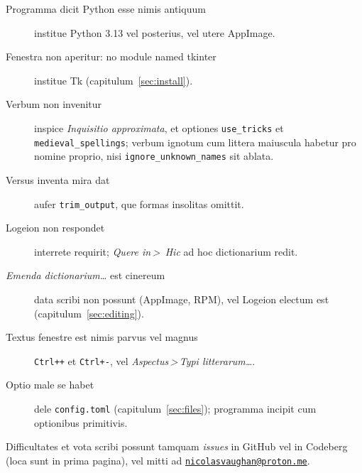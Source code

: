 \documentclass[12pt,
              article,
              oneside
              ]{memoir}
\newcommand*{\menu}[1]{\textit{#1}}
\newcommand*{\then}{\,>\,}
\newcommand*{\key}[1]{\texttt{#1}}
\begin{document}
%
\begin{description}
\item[Programma dicit Python esse nimis antiquum] institue Python 3.13
  vel posterius, vel utere AppImage.
\item[Fenestra non aperitur: no module named tkinter] institue Tk
  (capitulum~\ref{sec:install}).
\item[Verbum non invenitur] inspice \menu{Inquisitio approximata}, et optiones
  \texttt{use\_tricks} et \texttt{medieval\_spellings}; verbum ignotum
  cum littera maiuscula habetur pro nomine proprio, nisi
  \texttt{ignore\_unknown\_names} sit ablata.
\item[Versus inventa mira dat] aufer \texttt{trim\_output}, que formas
  insolitas omittit.
\item[Logeion non respondet] interrete requirit; \menu{Quere in\then
  Hic} ad hoc dictionarium redit.
\item[\menu{Emenda dictionarium\ldots} est cinereum] data scribi non possunt
  (AppImage, RPM), vel Logeion electum est (capitulum~\ref{sec:editing}).
\item[Textus fenestre est nimis parvus vel magnus] \key{Ctrl++} et
  \key{Ctrl+-}, vel \menu{Aspectus\then Typi litterarum\ldots}.
\item[Optio male se habet] dele \texttt{config.toml}
  (capitulum~\ref{sec:files}); programma incipit cum optionibus
  primitivis.
\end{description}

\noindent
Difficultates et vota scribi possunt tamquam \textit{issues} in GitHub vel
in Codeberg (loca sunt in prima pagina), vel mitti ad
\href{mailto:nicolasvaughan@proton.me}{\texttt{nicolasvaughan@proton.me}}.

\printindex
\end{document}
